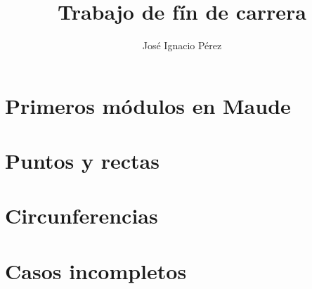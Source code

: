 \documentclass[12pt,a4paper,draft]{book}
\author{Jos\'e Ignacio P\'erez}
\title{Trabajo de f\'in de carrera}
\begin{document}
\newcommand{\codesize}{\small}

\tableofcontents

\chapter{Primeros módulos en Maude}\label{cap.1}

\chapter{Puntos y rectas}\label{cap.2}

\chapter{Circunferencias}\label{cap.3}

\chapter{Casos incompletos}\label{cap.4}

\end{document}
